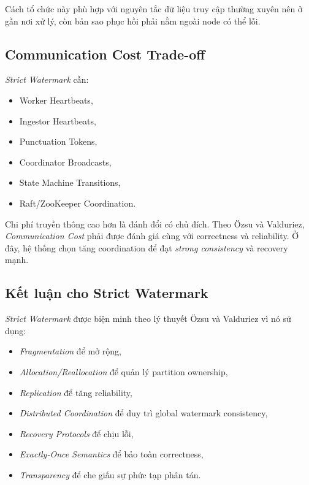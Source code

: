 \documentclass[12pt,a4paper]{article}
\begin{document}
Cách tổ chức này phù hợp với nguyên tắc dữ liệu truy cập thường xuyên nên ở gần nơi xử lý, còn bản sao phục hồi phải nằm ngoài node có thể lỗi.

\subsection{Communication Cost Trade-off}

\textit{Strict Watermark} cần:

\begin{itemize}
    \item Worker Heartbeats,
    \item Ingestor Heartbeats,
    \item Punctuation Tokens,
    \item Coordinator Broadcasts,
    \item State Machine Transitions,
    \item Raft/ZooKeeper Coordination.
\end{itemize}

Chi phí truyền thông cao hơn là đánh đổi có chủ đích. Theo Özsu và Valduriez, \textit{Communication Cost} phải được đánh giá cùng với correctness và reliability. Ở đây, hệ thống chọn tăng coordination để đạt \textit{strong consistency} và recovery mạnh.

\subsection{Kết luận cho Strict Watermark}

\textit{Strict Watermark} được biện minh theo lý thuyết Özsu và Valduriez vì nó sử dụng:

\begin{itemize}
    \item \textit{Fragmentation} để mở rộng,
    \item \textit{Allocation/Reallocation} để quản lý partition ownership,
    \item \textit{Replication} để tăng reliability,
    \item \textit{Distributed Coordination} để duy trì global watermark consistency,
    \item \textit{Recovery Protocols} để chịu lỗi,
    \item \textit{Exactly-Once Semantics} để bảo toàn correctness,
    \item \textit{Transparency} để che giấu sự phức tạp phân tán.
\end{itemize}
\end{document}
